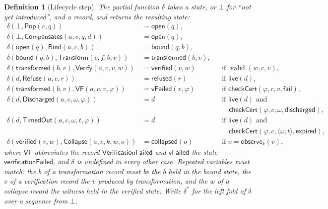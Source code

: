 \documentclass[11pt,openany]{book}
\newtheorem{definition}[theorem]{Definition}
\theoremstyle{remark}
\newcommand{\Pop}{\mathsf{Pop}}
\newcommand{\Refuse}{\mathsf{Refuse}}
\newcommand{\Bind}{\mathsf{Bind}}
\newcommand{\Transform}{\mathsf{Transform}}
\newcommand{\Verify}{\mathsf{Verify}}
\newcommand{\Collapse}{\mathsf{Collapse}}
\newcommand{\Compensates}{\mathsf{Compensates}}
\newcommand{\valid}{\operatorname{valid}}
\begin{document}
\begin{definition}[Lifecycle step]\label{def:delta}
The partial function $\delta$ takes a state, or $\bot$ for ``not yet
introduced'', and a record, and returns the resulting state:
\[
\begin{aligned}
\delta(\bot,\Pop(c,q))&=\mathsf{open}(q),\\
\delta(\bot,\Compensates(a,c,q,d))&=\mathsf{open}(q),\\
\delta(\mathsf{open}(q),\Bind(a,c,b))&=\mathsf{bound}(q,b),\\
\delta(\mathsf{bound}(q,b),\Transform(c,f,b,v))&=\mathsf{transformed}(b,v),\\
\delta(\mathsf{transformed}(b,v),\Verify(a,c,v,w))&=\mathsf{verified}(v,w)
  &&\text{if }\valid(w,c,v),\\
\delta(d,\Refuse(a,c,r))&=\mathsf{refused}(r)
  &&\text{if }\mathsf{live}(d),\\
\delta(\mathsf{transformed}(b,v),\mathsf{VF}(a,c,v,\varphi))
  &=\mathsf{vFailed}(v,\varphi)
  &&\text{if }\mathsf{checkCert}(\varphi,c,v,\mathsf{fail}),\\
\delta(d,\mathsf{Discharged}(a,c,\omega,\varphi))&=d
  &&\text{if }\mathsf{live}(d)\text{ and}\\
  &&&\quad\mathsf{checkCert}(\varphi,c,\omega,\mathsf{discharged}),\\
\delta(d,\mathsf{TimedOut}(a,c,\omega,t,\varphi))&=d
  &&\text{if }\mathsf{live}(d)\text{ and}\\
  &&&\quad\mathsf{checkCert}(\varphi,c,\langle\omega,t\rangle,\mathsf{expired}),\\
\delta(\mathsf{verified}(v,w),\Collapse(a,c,k,w,o))&=\mathsf{collapsed}(o)
  &&\text{if }o=\mathsf{observe}_k(v),
\end{aligned}
\]
where $\mathsf{VF}$ abbreviates the record $\mathsf{VerificationFailed}$
and $\mathsf{vFailed}$ the state $\mathsf{verificationFailed}$, and $\delta$
is undefined in every other case. Repeated variables must match: the
$b$ of a transformation record must be the $b$ held in the bound state,
the $v$ of a verification record the $v$ produced by transformation, and
the $w$ of a collapse record the witness held in the verified state. Write
$\delta^{*}$ for the left fold of $\delta$ over a sequence from $\bot$.
\end{definition}
\end{document}
